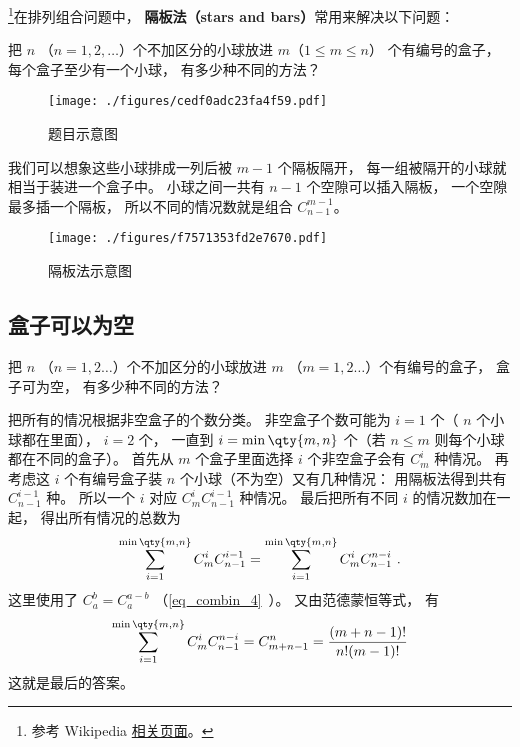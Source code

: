 


\footnote{参考 Wikipedia \href{https://en.wikipedia.org/wiki/Stars_and_bars_(combinatorics)}{相关页面}。}在排列组合问题中， \textbf{隔板法（stars and bars）}常用来解决以下问题：

\begin{example}{}
把 $n$ （$n = 1,2,\dots$）个不加区分的小球放进 $m$（$1\leqslant m\leqslant n$） 个有编号的盒子， 每个盒子至少有一个小球， 有多少种不同的方法？
\begin{figure}[ht]
\centering
\texttt{[image: ./figures/cedf0adc23fa4f59.pdf]}
\caption{题目示意图} \label{fig_BarCom_1}
\end{figure}
\end{example}

我们可以想象这些小球排成一列后被 $m-1$ 个隔板隔开， 每一组被隔开的小球就相当于装进一个盒子中。 小球之间一共有 $n-1$ 个空隙可以插入隔板， 一个空隙最多插一个隔板， 所以不同的情况数就是组合 $C_{n-1}^{m-1}$。
\begin{figure}[ht]
\centering
\texttt{[image: ./figures/f7571353fd2e7670.pdf]}
\caption{隔板法示意图} \label{fig_BarCom_2}
\end{figure}

\subsection{盒子可以为空}


\begin{example}{}
把 $n$ （$n=1,2\dots$）个不加区分的小球放进 $m$ （$m=1,2\dots$）个有编号的盒子， 盒子可为空， 有多少种不同的方法？
\end{example}

把所有的情况根据非空盒子的个数分类。 非空盒子个数可能为 $i=1$ 个（ $n$ 个小球都在里面）， $i=2$ 个， 一直到 $i=\min\qty{m,n}$ 个（若 $n\leqslant m$ 则每个小球都在不同的盒子）。 首先从 $m$ 个盒子里面选择 $i$ 个非空盒子会有 $C_m^i$ 种情况。 再考虑这 $i$ 个有编号盒子装 $n$ 个小球（不为空）又有几种情况： 用隔板法得到共有 $C_{n-1}^{i-1}$ 种。 所以一个 $i$ 对应 $C_m^i C_{n-1}^{i-1}$ 种情况。 最后把所有不同 $i$ 的情况数加在一起， 得出所有情况的总数为
\begin{equation}
\sum_{i = 1}^{\min\qty{m,n}} C_m^i C_{n-1}^{i-1} = \sum_{i=1}^{\min\qty{m,n}}  C_m^i C_{n-1}^{n-i}~.
\end{equation}
这里使用了 $C_a^b = C_a^{a-b}$ （\autoref{eq_combin_4}~）。 又由范德蒙恒等式， 有
\begin{equation}
\sum_{i=1}^{\min\qty{m,n}}  C_m^i C_{n-1}^{n-i} = C_{m+n-1}^n = \frac{(m+n-1)!}{n!(m - 1)!}
\end{equation}
这就是最后的答案。
